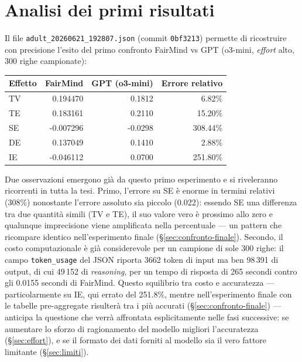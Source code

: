 \section{Analisi dei primi risultati}
\label{sec:analisi-json}

Il file \texttt{adult\_20260621\_192807.json} (commit \texttt{0bf3213}) permette di ricostruire con precisione l'esito del primo confronto FairMind vs GPT (o3-mini, \emph{effort} alto, 300 righe campionate):

\begin{center}
\begin{tabular}{lrrr}
\toprule
Effetto & FairMind & GPT (o3-mini) & Errore relativo \\
\midrule
TV & 0.194470 & 0.1812 & 6.82\% \\
TE & 0.183161 & 0.2110 & 15.20\% \\
SE & -0.007296 & -0.0298 & 308.44\% \\
DE & 0.137049 & 0.1410 & 2.88\% \\
IE & -0.046112 & 0.0700 & 251.80\% \\
\bottomrule
\end{tabular}
\end{center}

Due osservazioni emergono già da questo primo esperimento e si riveleranno ricorrenti in tutta la tesi. Primo, l'errore su SE è enorme in termini relativi (308\%) nonostante l'errore assoluto sia piccolo (0.022): essendo SE una differenza tra due quantità simili (TV e TE), il suo valore vero è prossimo allo zero e qualunque imprecisione viene amplificata nella percentuale --- un pattern che ricompare identico nell'esperimento finale (\S\ref{sec:confronto-finale}). Secondo, il costo computazionale è già considerevole per un campione di sole 300 righe: il campo \texttt{token\_usage} del JSON riporta 3662 token di input ma ben 98\,391 di output, di cui 49\,152 di \emph{reasoning}, per un tempo di risposta di 265 secondi contro gli 0.0155 secondi di FairMind. Questo squilibrio tra costo e accuratezza --- particolarmente su IE, qui errato del 251.8\%, mentre nell'esperimento finale con le tabelle pre-aggregate risulterà tra i più accurati (\S\ref{sec:confronto-finale}) --- anticipa la questione che verrà affrontata esplicitamente nelle fasi successive: se aumentare lo sforzo di ragionamento del modello migliori l'accuratezza (\S\ref{sec:effort}), e se il formato dei dati forniti al modello sia il vero fattore limitante (\S\ref{sec:limiti}).
